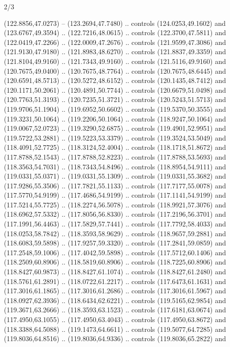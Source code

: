 \begin{flagdescription}{2/3}
\begin{scope}[xshift=0.5\flaglength,yshift=0.5\flagwidth,scale=\flagwidth/180]
\begin{scope}[y=0.8pt, x=0.8pt, yscale=-1,shift={(-168.75,-108.75)}]
  (122.8856,47.0273) -- (123.2694,47.7480) .. controls (124.0253,49.1602) and
  (123.6767,49.3594) .. (122.7216,48.0615) .. controls (122.3700,47.5811) and
  (122.0419,47.2266) .. (122.0009,47.2676) .. controls (121.9599,47.3086) and
  (121.9130,47.9180) .. (121.8983,48.6270) .. controls (121.8837,49.3359) and
  (121.8104,49.9160) .. (121.7343,49.9160) .. controls (121.5116,49.9160) and
  (120.7675,49.0400) .. (120.7675,48.7764) .. controls (120.7675,48.6445) and
  (120.6591,48.5713) .. (120.5272,48.6152) .. controls (120.1435,48.7412) and
  (120.1171,50.2061) .. (120.4891,50.7744) .. controls (120.6679,51.0498) and
  (120.7763,51.3193) .. (120.7235,51.3721) .. controls (120.5243,51.5713) and
  (119.9706,51.1904) .. (119.6952,50.6602) .. controls (119.5370,50.3555) and
  (119.3231,50.1064) .. (119.2206,50.1064) .. controls (118.9247,50.1064) and
  (119.0067,52.0723) .. (119.3290,52.6875) .. controls (119.4901,52.9951) and
  (119.5722,53.2881) .. (119.5223,53.3379) .. controls (119.3524,53.5049) and
  (118.4091,52.7725) .. (118.3124,52.4004) .. controls (118.1718,51.8672) and
  (117.8788,52.1543) .. (117.8788,52.8223) .. controls (117.8788,53.5693) and
  (118.3563,54.7031) .. (118.7343,54.8496) .. controls (118.8954,54.9111) and
  (119.0331,55.0371) .. (119.0331,55.1309) .. controls (119.0331,55.3682) and
  (117.9286,55.3506) .. (117.7821,55.1133) .. controls (117.7177,55.0078) and
  (117.5770,54.9199) .. (117.4686,54.9199) .. controls (117.1141,54.9199) and
  (117.5214,55.7725) .. (118.2274,56.5078) .. controls (118.9921,57.3076) and
  (118.6962,57.5332) .. (117.8056,56.8330) .. controls (117.2196,56.3701) and
  (117.1991,56.4463) .. (117.5829,57.7441) .. controls (117.7792,58.4033) and
  (118.0253,58.7842) .. (118.3593,58.9629) .. controls (118.9657,59.2881) and
  (118.6083,59.5898) .. (117.9257,59.3320) .. controls (117.2841,59.0859) and
  (117.2548,59.1006) .. (117.4042,59.5898) .. controls (117.5712,60.1406) and
  (118.2509,60.8906) .. (118.5819,60.8906) .. controls (118.7225,60.8906) and
  (118.8427,60.9873) .. (118.8427,61.1074) .. controls (118.8427,61.2480) and
  (118.5761,61.2891) .. (118.0722,61.2217) .. controls (117.6473,61.1631) and
  (117.3016,61.1865) .. (117.3016,61.2686) .. controls (117.3016,61.5967) and
  (118.0927,62.3936) .. (118.6434,62.6221) .. controls (119.5165,62.9854) and
  (119.3671,63.2666) .. (118.3593,63.1523) .. controls (117.6181,63.0674) and
  (117.4950,63.1055) .. (117.4950,63.4043) .. controls (117.4950,63.8672) and
  (118.3388,64.5088) .. (119.1473,64.6611) .. controls (119.5077,64.7285) and
  (119.8036,64.8516) .. (119.8036,64.9336) .. controls (119.8036,65.2822) and

\end{scope}
\end{scope}
\end{flagdescription}
